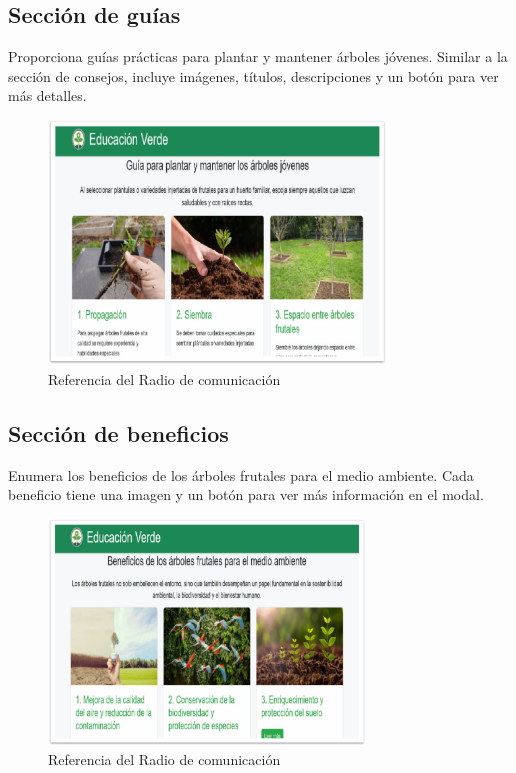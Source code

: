 \documentclass[11pt, a4paper, oneside]{book}
\begin{document}
\subsection {Sección de guías}
Proporciona guías prácticas para plantar y mantener árboles jóvenes.
Similar a la sección de consejos, incluye imágenes, títulos, descripciones y un botón para ver más detalles.
\begin{figure}[H]
\centering
\includegraphics[width=0.8\textwidth, height=0.5\textwidth]{Pictures/guias.png}
\caption{Referencia del Radio de comunicación}
\end{figure}

\subsection { Sección de beneficios}
Enumera los beneficios de los árboles frutales para el medio ambiente.
Cada beneficio tiene una imagen y un botón para ver más información en el modal.
\begin{figure}[H]
\centering
\includegraphics[width=0.75\textwidth]{Pictures/beneficios.png}
\caption{Referencia del Radio de comunicación}
\end{figure}
\end{document}
